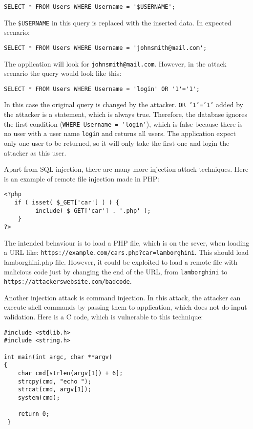 \documentclass[a4paper]{article}
\begin{document}
\begin{verbatim}
SELECT * FROM Users WHERE Username = '$USERNAME';
\end{verbatim}

The \texttt{\$USERNAME} in this query is replaced with the inserted data. In
expected scenario:

\begin{verbatim}
SELECT * FROM Users WHERE Username = 'johnsmith@mail.com';
\end{verbatim}

The application will look for \texttt{johnsmith@mail.com}. However, in the
attack scenario the query would look like this:

\begin{verbatim}
SELECT * FROM Users WHERE Username = 'login' OR '1'='1';
\end{verbatim}

In this case the original query is changed by the attacker. \texttt{OR '1'='1'}
added by the attacker is a statement, which is always true. Therefore, the
database ignores the first condition (\texttt{WHERE Username = 'login'}), which
is false because there is no user with a user name \texttt{login} and returns
all users. The application expect only one user to be returned, so it will only
take the first one and login the attacker as this user.

Apart from SQL injection, there are many more injection attack techniques. Here
is an example of remote file injection made in PHP:

\begin{verbatim}
<?php
   if ( isset( $_GET['car'] ) ) {
         include( $_GET['car'] . '.php' );
    }
?>
\end{verbatim}

The intended behaviour is to load a PHP file, which is on the sever, when
loading a URL like: \texttt{https://example.com/cars.php?car=lamborghini}. This
should load lamborghini.php file. However, it could be exploited to load a
remote file with malicious code just by changing the end of the URL, from
\texttt{lamborghini} to \texttt{https://attackerswebsite.com/badcode}.

Another injection attack is command injection. In this attack, the attacker can
execute shell commands by passing them to application, which does not do input
validation. Here is a C code, which is vulnerable to this technique:

\begin{verbatim}
#include <stdlib.h>
#include <string.h>

int main(int argc, char **argv)
{
	char cmd[strlen(argv[1]) + 6];
	strcpy(cmd, "echo ");
	strcat(cmd, argv[1]);
	system(cmd);
        
	return 0;
 }
\end{verbatim}
\end{document}
